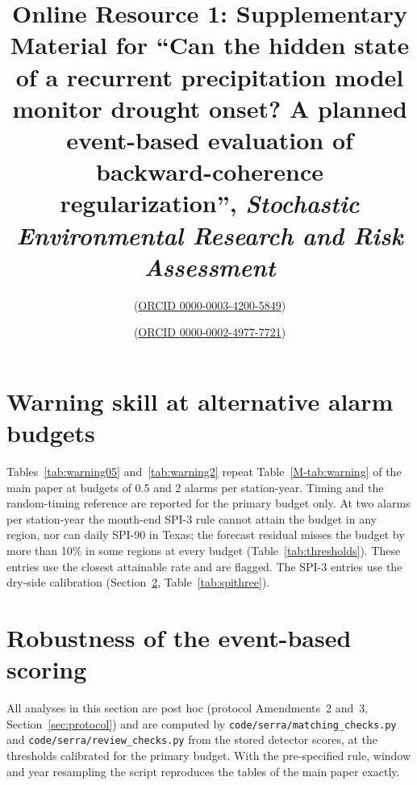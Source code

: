 \documentclass[pdflatex,sn-mathphys-ay]{sn-jnl}
\newcommand{\orcidtext}[1]{{\small(\href{https://orcid.org/#1}{ORCID #1})}\,}
\begin{document}
\title[Online Resource 1]{Online Resource 1: Supplementary Material for ``Can the hidden state of a
recurrent precipitation model monitor drought onset? A planned event-based evaluation of
backward-coherence regularization'', \emph{Stochastic Environmental Research and Risk Assessment}}
\author[1]{ \,\orcidtext{0000-0003-4200-5849}}
\author*[1]{ \,\orcidtext{0000-0002-4977-7721}}
\maketitle

\section{Warning skill at alternative alarm budgets}\label{sec:budgets}
Tables~\ref{tab:warning05} and~\ref{tab:warning2} repeat Table~\ref{M-tab:warning} of the main paper at budgets of 0.5
and 2 alarms per station-year. Timing and the random-timing reference are reported for the primary budget
only. At two alarms per station-year the month-end SPI-3 rule cannot attain the budget in any region, nor
can daily SPI-90 in Texas; the forecast residual misses the budget by more than 10\% in some regions at
every budget (Table~\ref{tab:thresholds}). These entries use the closest attainable rate and are flagged.
The SPI-3 entries use the dry-side calibration (Section~\ref{sec:matching}, Table~\ref{tab:spithree}).



\FloatBarrier

\section{Robustness of the event-based scoring}\label{sec:matching}
All analyses in this section are post hoc (protocol Amendments~2 and~3, Section~\ref{sec:protocol}) and
are computed by \texttt{code/serra/matching\_checks.py} and \texttt{code/serra/review\_checks.py} from the
stored detector scores, at the thresholds calibrated for the primary budget. With the pre-specified rule, window and year resampling the script
reproduces the tables of the main paper exactly.
\end{document}
